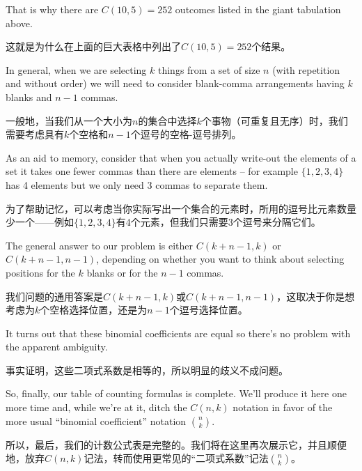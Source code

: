 That is why there are $C(10, 5) = 252$ outcomes
listed in the giant tabulation above.

这就是为什么在上面的巨大表格中列出了$C(10, 5) = 252$个结果。

In general, when we are selecting $k$ things from a set of size $n$ 
(with repetition and without order) we will need to consider 
blank-comma arrangements having $k$ blanks and $n-1$ commas.

一般地，当我们从一个大小为$n$的集合中选择$k$个事物（可重复且无序）时，我们需要考虑具有$k$个空格和$n-1$个逗号的空格-逗号排列。

As an
aid to memory, consider that when you actually write-out the elements
of a set it takes one fewer commas than there are elements -- for example
$\{1,2,3,4\}$ has 4 elements but we only need 3 commas to separate them.

为了帮助记忆，可以考虑当你实际写出一个集合的元素时，所用的逗号比元素数量少一个——例如$\{1,2,3,4\}$有4个元素，但我们只需要3个逗号来分隔它们。

The general answer to our problem is either $C(k+n-1,k)$ or 
  $C(k+n-1, n-1)$, depending on whether you want to think about
selecting positions for the $k$ blanks or for the $n-1$ commas.

我们问题的通用答案是$C(k+n-1,k)$或$C(k+n-1, n-1)$，这取决于你是想考虑为$k$个空格选择位置，还是为$n-1$个逗号选择位置。

It turns out that these binomial coefficients are equal so there's
no problem with the apparent ambiguity.

事实证明，这些二项式系数是相等的，所以明显的歧义不成问题。

So, finally, our table of counting formulas is complete.  We'll produce
it here one more time and, while we're at it, ditch the $C(n,k)$ notation in 
favor of the more usual ``binomial coefficient'' notation $\binom{n}{k}$.

所以，最后，我们的计数公式表是完整的。我们将在这里再次展示它，并且顺便地，放弃$C(n,k)$记法，转而使用更常见的“二项式系数”记法$\binom{n}{k}$。


